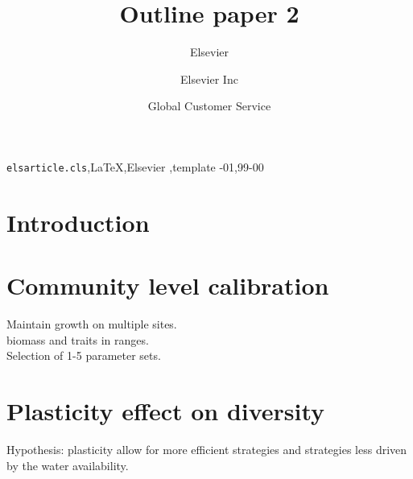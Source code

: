 \documentclass[review]{elsarticle}
\begin{document}
\begin{frontmatter}

\title{Outline paper 2}

\author{Elsevier}
\address{Radarweg 29, Amsterdam}

\author[mymainaddress,mysecondaryaddress]{Elsevier Inc}

\author[mysecondaryaddress]{Global Customer Service}

\address[mymainaddress]{1600 John F Kennedy Boulevard, Philadelphia}
\address[mysecondaryaddress]{360 Park Avenue South, New York}

\begin{abstract}
\end{abstract}

\begin{keyword}
\texttt{elsarticle.cls}\sep \LaTeX\sep Elsevier \sep template
-01\sep  99-00
\end{keyword}

\end{frontmatter}

\linenumbers


\section{Introduction}

\section{Community level calibration}
Maintain growth on multiple sites.\\
biomass and traits in ranges.\\

Selection of 1-5 parameter sets.
 

\section{Plasticity effect on diversity}
Hypothesis: plasticity allow for more efficient strategies and strategies less driven by the water availability.\\
\end{document}
